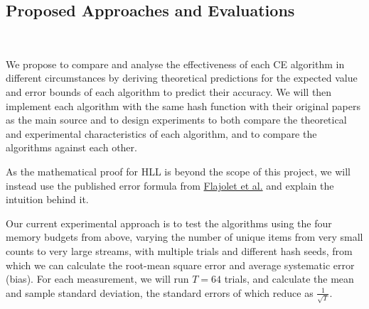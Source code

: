 \subsection{Proposed Approaches and Evaluations}
 \\

We propose to compare and analyse the effectiveness of each CE algorithm in different circumstances by deriving theoretical predictions for the expected value and error bounds of each algorithm to predict their accuracy. We will then implement each algorithm with the same hash function with their original papers as the main source and to design experiments to both compare the theoretical and experimental characteristics of each algorithm, and to compare the algorithms against each other. 

As the mathematical proof for HLL is beyond the scope of this project, we will instead use the published error formula from \hyperref[flajolet2007]{Flajolet et al.} and explain the intuition behind it. 



Our current experimental approach is to test the algorithms using the four memory budgets from above, varying the number of unique items from very small counts to very large streams, with multiple trials and different hash seeds, from which we can calculate the root-mean square error and average systematic error (bias). For each measurement, we will run $T = 64$ trials, and calculate the mean and sample standard deviation, the standard errors of which reduce as $\frac{1}{\sqrt{T}}$.


